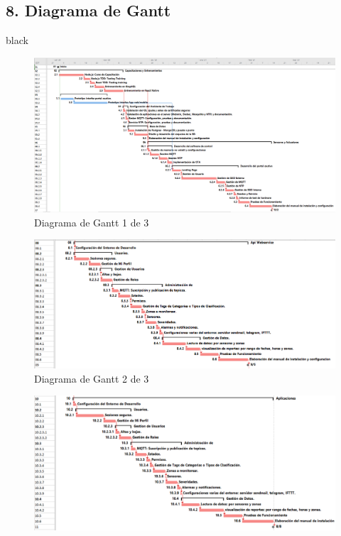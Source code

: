 \documentclass[11pt]{charter}
\begin{document}
\begin{landscape}
\section{8. Diagrama de Gantt}
\label{sec:gantt}

\begin{consigna}{black}

\vspace{5px}

\begin{figure}[htpb]
	\centering 
	\includegraphics[width=1.4\textwidth]{./Figuras/gantt01.png}
	\caption{Diagrama de Gantt 1 de 3}
	\label{fig:gantt01}
\end{figure}
\vspace{5px}
\newpage
\vspace*{2px}
\begin{figure}[htpb]
	\centering 
	\includegraphics[width=1.3\textwidth]{./Figuras/gantt02.png}
	\caption{Diagrama de Gantt 2 de 3}
	\label{fig:gantt02}
\end{figure}
\vspace{5px}
\newpage
\vspace*{2px}
\begin{figure}[htpb]
	\centering 
	\includegraphics[width=1.4\textwidth]{./Figuras/gantt03.png}

\end{figure}
\end{consigna}
\end{landscape}
\end{document}
